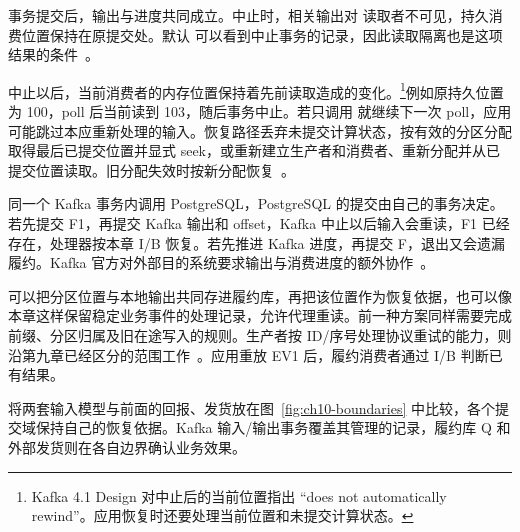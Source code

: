 事务提交后，输出与进度共同成立。中止时，相关输出对  读取者不可见，持久消费位置保持在原提交处。默认  可以看到中止事务的记录，因此读取隔离也是这项结果的条件~\cite{kafka-design}。

中止以后，当前消费者的内存位置保持着先前读取造成的变化。\footnote{Kafka 4.1 Design 对中止后的当前位置指出 ``does not automatically rewind''。应用恢复时还要处理当前位置和未提交计算状态。}例如原持久位置为 100，poll 后当前读到 103，随后事务中止。若只调用  就继续下一次 poll，应用可能跳过本应重新处理的输入。恢复路径丢弃未提交计算状态，按有效的分区分配取得最后已提交位置并显式 seek，或重新建立生产者和消费者、重新分配并从已提交位置读取。旧分配失效时按新分配恢复~\cite{kafka-design}。

同一个 Kafka 事务内调用 PostgreSQL，PostgreSQL 的提交由自己的事务决定。若先提交 F1，再提交 Kafka 输出和 offset，Kafka 中止以后输入会重读，F1 已经存在，处理器按本章 I/B 恢复。若先推进 Kafka 进度，再提交 F，退出又会遗漏履约。Kafka 官方对外部目的系统要求输出与消费进度的额外协作~\cite{kafka-design}。

可以把分区位置与本地输出共同存进履约库，再把该位置作为恢复依据，也可以像本章这样保留稳定业务事件的处理记录，允许代理重读。前一种方案同样需要完成前缀、分区归属及旧在途写入的规则。生产者按 ID/序号处理协议重试的能力，则沿第九章已经区分的范围工作~\cite{kafka-producer}。应用重放 EV1 后，履约消费者通过 I/B 判断已有结果。

将两套输入模型与前面的回报、发货放在图~\ref{fig:ch10-boundaries} 中比较，各个提交域保持自己的恢复依据。Kafka 输入/输出事务覆盖其管理的记录，履约库 Q 和外部发货则在各自边界确认业务效果。


